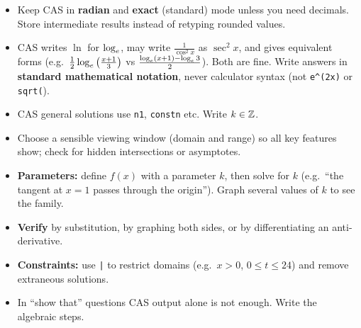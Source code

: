 \begin{cols}
\begin{tip}
\begin{itemize}
  \item Keep CAS in \textbf{radian} and \textbf{exact} (standard) mode unless you need decimals. Store intermediate results instead of retyping rounded values.
  \item CAS writes $\ln$ for $\log_e$, may write $\frac{1}{\cos^2x}$ as $\sec^2x$, and gives equivalent forms (e.g.\ $\frac12\log_e\left(\frac{x+1}{3}\right)$ vs $\frac{\log_e(x+1)-\log_e3}{2}$). Both are fine. Write answers in \textbf{standard mathematical notation}, never calculator syntax (not \texttt{e\^{}(2x)} or \texttt{sqrt(}).
  \item CAS general solutions use \texttt{n1}, \texttt{constn} etc. Write $k\in\mathbb{Z}$.
  \item Choose a sensible viewing window (domain and range) so all key features show; check for hidden intersections or asymptotes.
\end{itemize}
\end{tip}
\nextcol
\begin{tip}
\begin{itemize}
  \item \textbf{Parameters:} define $f(x)$ with a parameter $k$, then solve for $k$ (e.g.\ ``the tangent at $x=1$ passes through the origin''). Graph several values of $k$ to see the family.
  \item \textbf{Verify} by substitution, by graphing both sides, or by differentiating an anti-derivative.
  \item \textbf{Constraints:} use \texttt{|} to restrict domains (e.g.\ $x>0$, $0\le t\le24$) and remove extraneous solutions.
  \item In ``show that'' questions CAS output alone is not enough. Write the algebraic steps.
\end{itemize}
\end{tip}
\end{cols}
